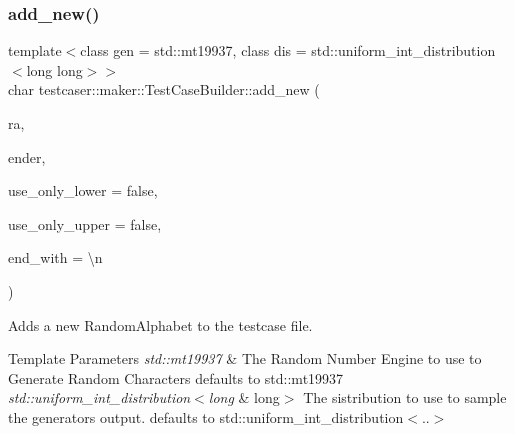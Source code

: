 \subsubsection{\texorpdfstring{add\_new()}{add\_new()}\hspace{0.1cm}{\footnotesize\ttfamily [1/9]}}
{\footnotesize\ttfamily template$<$class gen  = std\+::mt19937, class dis  = std\+::uniform\+\_\+int\+\_\+distribution$<$long long$>$$>$ \\
char testcaser\+::maker\+::\+Test\+Case\+Builder\+::add\+\_\+new (\begin{DoxyParamCaption}\item[{\mbox{\hyperlink{structtestcaser_1_1maker_1_1types_1_1RandomAlphabet}{types\+::\+Random\+Alphabet}}$<$ gen, dis $>$ \&}]{ra,  }\item[{bool}]{ender,  }\item[{bool}]{use\+\_\+only\+\_\+lower = {\ttfamily false},  }\item[{bool}]{use\+\_\+only\+\_\+upper = {\ttfamily false},  }\item[{char}]{end\+\_\+with = {\ttfamily \textquotesingle{}\textbackslash{}n\textquotesingle{}} }\end{DoxyParamCaption})\hspace{0.3cm}{\ttfamily [inline]}}



Adds a new Random\+Alphabet to the testcase file. 


\begin{DoxyTemplParams}{Template Parameters}
{\em std\+::mt19937} & The Random Number Engine to use to Generate Random Characters defaults to std\+::mt19937 \\
\hline
{\em std\+::uniform\+\_\+int\+\_\+distribution$<$long} & long$>$ The sistribution to use to sample the generator\textquotesingle{}s output. defaults to std\+::uniform\+\_\+int\+\_\+distribution$<$..$>$ \\
\hline
\end{DoxyTemplParams}

